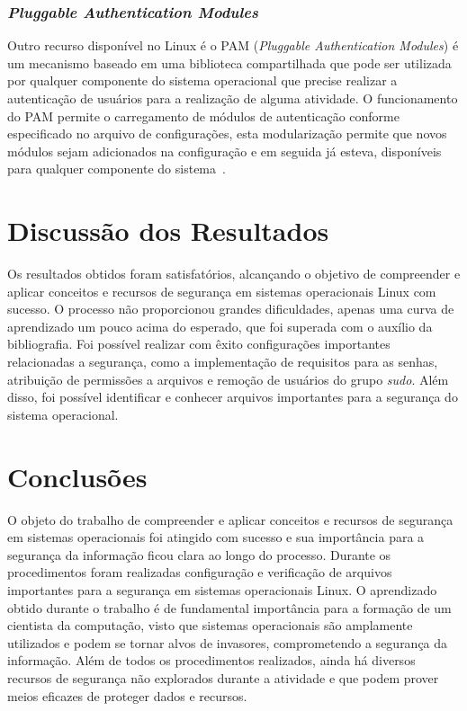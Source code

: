 \documentclass[
  12pt,				%
  oneside,   	        %
  a4paper,			%
  english,			%
  french,				%
  spanish,			%
  brazil,				%
  ]{pacotes/abntex2}
\begin{document}
\subsubsection{\textit{Pluggable Authentication Modules}}
Outro recurso disponível no Linux é o PAM (\textit{Pluggable Authentication Modules}) é um mecanismo baseado em uma biblioteca compartilhada que pode ser utilizada por qualquer componente do sistema operacional que precise realizar a autenticação de usuários para a realização de alguma atividade. O funcionamento do PAM permite o carregamento de módulos de autenticação conforme especificado no arquivo de configurações, esta modularização permite que novos módulos sejam adicionados na configuração e em seguida já esteva, disponíveis para qualquer componente do sistema~\cite{silberschatz2015}.

\section{Discussão dos Resultados}
\label{sec:discussao}

Os resultados obtidos foram satisfatórios, alcançando o objetivo de compreender e aplicar conceitos e recursos de segurança em sistemas operacionais Linux com sucesso. O processo não proporcionou grandes dificuldades, apenas uma curva de aprendizado um pouco acima do esperado, que foi superada com o auxílio da bibliografia. Foi possível realizar com êxito configurações importantes relacionadas a segurança, como a implementação de requisitos para as senhas, atribuição de permissões a arquivos e remoção de usuários do grupo \textit{sudo}. Além disso, foi possível identificar e conhecer arquivos importantes para a segurança do sistema operacional.

\section{Conclusões}
\label{sec:conclusoes}

O objeto do trabalho de compreender e aplicar conceitos e recursos de segurança em sistemas operacionais foi atingido com sucesso e sua importância para a segurança da informação ficou clara ao longo do processo. Durante os procedimentos foram realizadas configuração e verificação de arquivos importantes para a segurança em sistemas operacionais Linux. O aprendizado obtido durante o trabalho é de fundamental importância para a formação de um cientista da computação, visto que sistemas operacionais são amplamente utilizados e podem se tornar alvos de invasores, comprometendo a segurança da informação. Além de todos os procedimentos realizados, ainda há diversos recursos de segurança não explorados durante a atividade e que podem prover meios eficazes de proteger dados e recursos.
\end{document}
